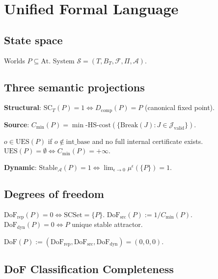 \section{Unified Formal Language}
\label{sec:language}

\subsection{State space}
Worlds $P\subseteq\mathrm{At}$. System $\mathcal{S}=(T,B_T,\mathcal{F},\Pi,\mathcal{A})$.

\subsection{Three semantic projections}

\textbf{Structural}: $\mathrm{SC}_T(P)=1\iff D_{\mathrm{comp}}(P)=P$ (canonical fixed point).

\textbf{Source}: $C_{\min}(P)=\min\text{-HS-cost}(\{\mathrm{Break}(J):J\in\mathcal{J}_{\mathrm{valid}}\})$.

\begin{definition}\label{def:ues}
$o\in\mathrm{UES}(P)$ if $o\notin\mathrm{int\_base}$ and no full internal certificate exists.
$\mathrm{UES}(P)=\emptyset\iff C_{\min}(P)=+\infty$.
\end{definition}

\textbf{Dynamic}: $\mathrm{Stable}_{\mathcal{A}}(P)=1\iff\lim_{\epsilon\to 0}\mu^\epsilon(\{P\})=1$.

\subsection{Degrees of freedom}

$\mathrm{DoF}_{\mathrm{rep}}(P)=0\iff\mathrm{SCSet}=\{P\}$.
$\mathrm{DoF}_{\mathrm{src}}(P):=1/C_{\min}(P)$.
$\mathrm{DoF}_{\mathrm{dyn}}(P)=0\iff P$ unique stable attractor.

\begin{definition}\label{def:zero-dof-lang}
$\mathrm{DoF}(P):=(\mathrm{DoF}_{\mathrm{rep}},\mathrm{DoF}_{\mathrm{src}},\mathrm{DoF}_{\mathrm{dyn}})=(0,0,0)$.
\end{definition}

\subsection{DoF Classification Completeness}

